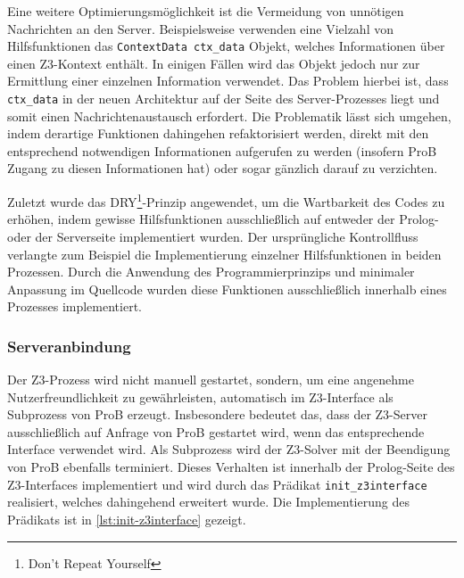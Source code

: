 Eine weitere Optimierungsmöglichkeit ist die Vermeidung von unnötigen Nachrichten an den Server.
Beispielsweise verwenden eine Vielzahl von Hilfsfunktionen das \texttt{ContextData ctx\_data} Objekt,
welches Informationen über einen Z3-Kontext enthält.
In einigen Fällen wird das Objekt jedoch nur zur Ermittlung einer einzelnen Information verwendet.
Das Problem hierbei ist,
dass \texttt{ctx\_data} in der neuen Architektur auf der Seite des Server-Prozesses liegt und somit einen Nachrichtenaustausch erfordert.
Die Problematik lässt sich umgehen, indem derartige Funktionen dahingehen refaktorisiert werden,
direkt mit den entsprechend notwendigen Informationen aufgerufen zu werden (insofern ProB Zugang zu diesen Informationen hat) oder sogar gänzlich darauf zu verzichten.



Zuletzt wurde das DRY\footnote{Don't Repeat Yourself}-Prinzip angewendet, um die Wartbarkeit des Codes zu erhöhen,
indem gewisse Hilfsfunktionen ausschließlich auf entweder der Prolog- oder der Serverseite implementiert wurden.
Der ursprüngliche Kontrollfluss verlangte zum Beispiel die Implementierung einzelner Hilfsfunktionen
in beiden Prozessen. Durch die Anwendung des Programmierprinzips und minimaler Anpassung im Quellcode wurden diese Funktionen ausschließlich innerhalb eines Prozesses implementiert.

\subsubsection{Serveranbindung}
\label{subsec:server-connection}

Der Z3-Prozess wird nicht manuell gestartet, sondern,
um eine angenehme Nutzerfreundlichkeit zu gewährleisten, automatisch im Z3-Interface als Subprozess von ProB erzeugt.
Insbesondere bedeutet das, dass der Z3-Server ausschließlich auf Anfrage von ProB gestartet wird, wenn das entsprechende Interface verwendet wird.
Als Subprozess wird der Z3-Solver mit der Beendigung von ProB ebenfalls terminiert.
Dieses Verhalten ist innerhalb der Prolog-Seite des Z3-Interfaces implementiert und wird durch das Prädikat \texttt{init\_z3interface} realisiert, welches dahingehend erweitert wurde.
Die Implementierung des Prädikats ist in \cref{lst:init-z3interface} gezeigt.

